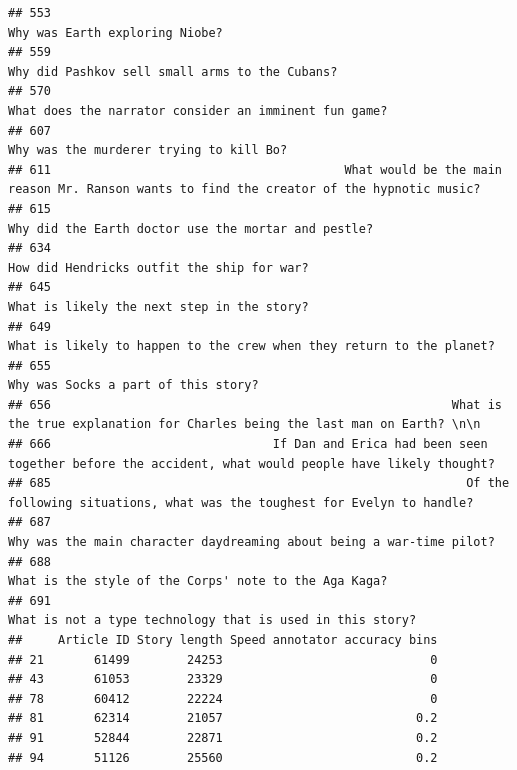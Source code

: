 \documentclass[
]{article}
\begin{document}
\begin{verbatim}
## 553                                                                                                    Why was Earth exploring Niobe?
## 559                                                                                    Why did Pashkov sell small arms to the Cubans?
## 570                                                                             What does the narrator consider an imminent fun game?
## 607                                                                                           Why was the murderer trying to kill Bo?
## 611                                         What would be the main reason Mr. Ranson wants to find the creator of the hypnotic music?
## 615                                                                               Why did the Earth doctor use the mortar and pestle?
## 634                                                                                        How did Hendricks outfit the ship for war?
## 645                                                                                        What is likely the next step in the story?
## 649                                                             What is likely to happen to the crew when they return to the planet? 
## 655                                                                                               Why was Socks a part of this story?
## 656                                                        What is the true explanation for Charles being the last man on Earth? \n\n
## 666                               If Dan and Erica had been seen together before the accident, what would people have likely thought?
## 685                                                          Of the following situations, what was the toughest for Evelyn to handle?
## 687                                                              Why was the main character daydreaming about being a war-time pilot?
## 688                                                                             What is the style of the Corps' note to the Aga Kaga?
## 691                                                                         What is not a type technology that is used in this story?
##     Article ID Story length Speed annotator accuracy bins
## 21       61499        24253                             0
## 43       61053        23329                             0
## 78       60412        22224                             0
## 81       62314        21057                           0.2
## 91       52844        22871                           0.2
## 94       51126        25560                           0.2

\end{verbatim}
\end{document}
